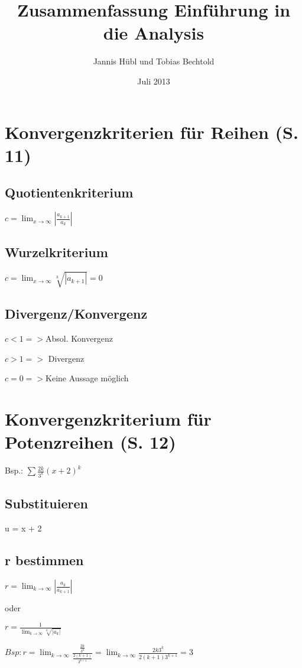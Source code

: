 \documentclass[a4paper, 11pt]{article}
\title{Zusammenfassung Einführung in die Analysis}
\author{Jannis Hübl und Tobias Bechtold}
\date{Juli 2013}
\begin{document}
\maketitle
\newpage
\tableofcontents
\newpage
\section{Konvergenzkriterien für Reihen (S. 11)}

\subsection{Quotientenkriterium}


$ c = \lim_{x \to \infty} |\frac {a_{k+1}} {a_{k}}|$


\subsection{Wurzelkriterium}

$ c = \lim_{x \to \infty} \sqrt[k]{|a_{k+1}|} = 0 $

\subsection{Divergenz/Konvergenz}

$ c < 1 => $Absol. Konvergenz

$ c > 1 => $ Divergenz

$ c = 0 => $Keine Aussage möglich

\section{Konvergenzkriterium für Potenzreihen (S. 12)}

Bsp.: $ \sum \frac{2k}{3^k} (x + 2)^k$

\subsection {Substituieren}
u = x + 2

\subsection {r bestimmen}

$ r = \lim_{k \to \infty} |\frac{a_k}{a_{k+1}}| $

oder

$ r = \frac {1} {\lim_{k \to \infty} \sqrt[k]{|a_k|}}$

$Bsp: r = \lim_{k \to
\infty} \frac {\frac {2k} {3^k}}{\frac{2(k+1)}{3^{k+1}}} = \lim_{k \to \infty}
\frac {2k 3^k} {2(k+1) 3^{k+1}} = 3$
\end{document}
